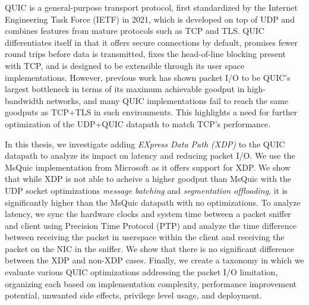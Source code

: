 QUIC is a general-purpose transport protocol, first standardized by the Internet Engineering Task Force (IETF) in 2021, which is developed on top of UDP and combines features from mature protocols such as TCP and TLS. QUIC differentiates itself in that it offers secure connections by default, promises fewer round trips before data is transmitted, fixes the head-of-line blocking present with TCP, and is designed to be extensible through its user space implementations. However, previous work has shown packet I/O to be QUIC's largest bottleneck in terms of its maximum achievable goodput in high-bandwidth networks, and many QUIC implementations fail to reach the same goodputs as TCP+TLS in such environments. This highlights a need for further optimization of the UDP+QUIC datapath to match TCP's performance.

In this thesis, we investigate adding \emph{EXpress Data Path (XDP)} to the QUIC datapath to analyze its impact on latency and reducing packet I/O. We use the MsQuic implementation from Microsoft as it offers support for XDP. We show that while XDP is not able to acheive a higher goodput than MsQuic with the UDP socket optimizations \emph{message batching} and \emph{segmentation offloading}, it is significantly higher than the MsQuic datapath with no optimizations. To analyze latency, we sync the hardware clocks and system time between a packet sniffer and client using Precision Time Protocol (PTP) and analyze the time difference between receiving the packet in userspace within the client and receiving the packet on the NIC in the sniffer. We show that there is no significant difference between the XDP and non-XDP cases. Finally, we create a taxonomy in which we evaluate various QUIC optimizations addressing the packet I/O limitation, organizing each based on implementation complexity, performance improvement potential, unwanted side effects, privilege level usage, and deployment.



